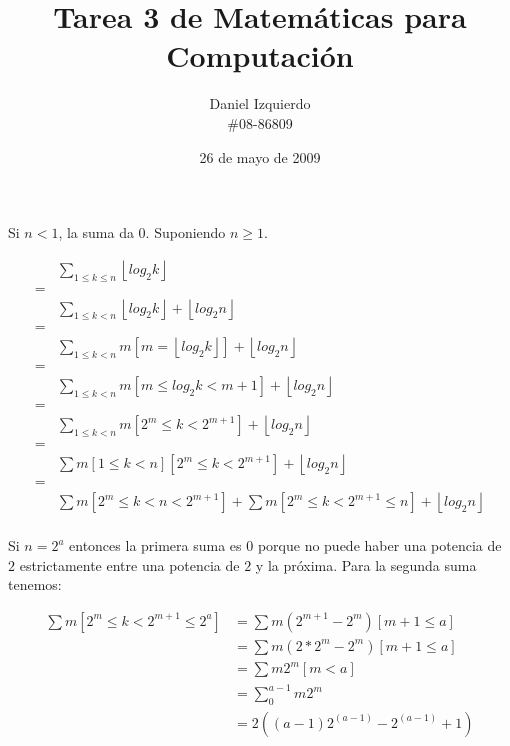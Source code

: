 \documentclass{article}
\newcommand{\piso}[1]{\left \lfloor #1 \right \rfloor}
\begin{document}

\title{Tarea 3 de Matemáticas para Computación}
\author{Daniel Izquierdo \\ \#08-86809}
\date{26 de mayo de 2009}

\maketitle

\section{}

Si $n < 1$, la suma da $0$. Suponiendo $n \geq 1$.

\begin{align*}
 & \sum_{1 \leq k \leq n} \piso{log_2k} \\
 = & \\
 & \sum_{1 \leq k < n} \piso{log_2k} + \piso{log_2n} \\
 = & \\
 & \sum_{1 \leq k < n} m[m = \piso{log_2k}] + \piso{log_2n} \\
 = & \\
 & \sum_{1 \leq k < n} m[m \leq log_2k < m+1] + \piso{log_2n} \\
 = & \\
 & \sum_{1 \leq k < n} m[2^m \leq k < 2^{m+1}] + \piso{log_2n} \\
 = & \\
 & \sum m[1 \leq k < n][2^m \leq k < 2^{m+1}] + \piso{log_2n} \\
 = & \\
 & \sum m[2^m \leq k < n < 2^{m+1}] + \sum m[2^m \leq k < 2^{m+1} \leq n] + \piso{log_2n} \\
\end{align*}

Si $n = 2^a$ entonces la primera suma es $0$ porque no puede haber una potencia de $2$
estrictamente entre una potencia de $2$ y la próxima. Para la segunda suma tenemos:

\begin{align*}
\sum m[2^m \leq k < 2^{m+1} \leq 2^a] & = \sum m (2^{m+1}-2^m)[m+1 \leq a] \\
  & = \sum m (2*2^m-2^m)[m+1 \leq a] \\
  & = \sum m 2^m[m < a] \\
  & = \sum_0^{a-1} m 2^m \\
  & = 2((a-1)2^{(a-1)} - 2^{(a-1)} + 1) \\
\end{align*}
\end{document}
